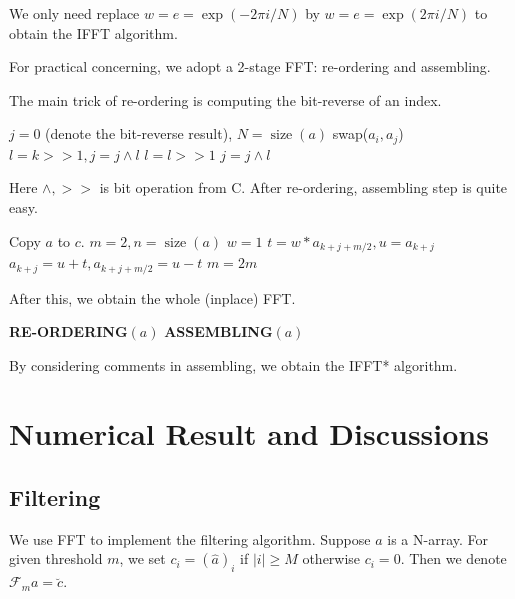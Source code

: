 \documentclass{article}
\DeclareMathOperator{\size}{size}
\begin{document}
We only need replace $w = e = \exp(-2\pi i/N)$ by $w = e = \exp(2\pi i/N)$ to obtain the IFFT algorithm.

For practical concerning, we adopt a 2-stage FFT: re-ordering and assembling.

The main trick of re-ordering is computing the bit-reverse of an index.
\begin{algorithm}[H]
	\caption{$\textbf{REORDER}(a)$}
	\begin{algorithmic}[1]
		\STATE $j=0$ (denote the bit-reverse result), $N = \size(a)$
		\STATE swap($a_i, a_j$)
		\ENDIF
		\STATE $l = k>>1, j = j\wedge l$
		\STATE $l=l>>1$
		\STATE $j=j\wedge l$
		\ENDWHILE
		\ENDFOR
		\end{algorithmic}
\end{algorithm}
Here $\wedge, >>$ is bit operation from C.
After re-ordering, assembling step is quite easy.
\begin{algorithm}[H]
	\caption{$\textbf{ASSEMBING}(a)$}
	\begin{algorithmic}[1]
		\STATE Copy $a$ to $c$.
		\STATE $m=2, n = \size(a)$
		 
		\STATE $w=1$
		\STATE $t = w*a_{k+j+m/2}, u = a_{k+j}$
		\STATE $a_{k+j} = u + t, a_{k+j+m/2} = u-t$
		\ENDFOR
		\ENDFOR
		\STATE $m = 2m$
		\ENDWHILE
		\STATE {}
		\end{algorithmic}
	\end{algorithm}

After this, we obtain the whole (inplace) FFT.
\begin{algorithm}[H]
	\caption{$\textbf{FFT}^*(a)$}
	\begin{algorithmic}[1]
		\STATE \textbf{RE-ORDERING}$(a)$
		\STATE \textbf{ASSEMBLING}$(a)$
		\end{algorithmic}
\end{algorithm}
By considering comments in assembling, we obtain the IFFT* algorithm.




\section{Numerical Result and Discussions}
\subsection{Filtering}
We use FFT to implement the filtering algorithm. Suppose $a$ is a N-array. For given threshold $m$, we set $c_i = (\hat a)_i$ if $|i|\ge M$ otherwise $c_i = 0$. Then we denote $\mathcal F_m a = \breve{c}$.
\end{document}
